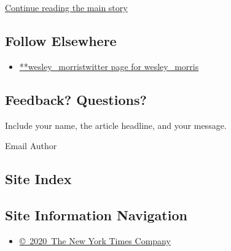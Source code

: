 \protect\hyperlink{after-mid2}{Continue reading the main story}

\hypertarget{follow-elsewhere}{%
\subsection{Follow Elsewhere}\label{follow-elsewhere}}

\begin{itemize}
\tightlist
\item
  \href{https://twitter.com/wesley_morris}{**wesley\_morristwitter page
  for wesley\_morris}
\end{itemize}

\hypertarget{feedback-questions}{%
\subsection{Feedback? Questions?}\label{feedback-questions}}

Include your name, the article headline, and your message.

Email Author

\hypertarget{site-index}{%
\subsection{Site Index}\label{site-index}}

\hypertarget{site-information-navigation}{%
\subsection{Site Information
Navigation}\label{site-information-navigation}}

\begin{itemize}
\tightlist
\item
  \href{https://help.nytimes3xbfgragh.onion/hc/en-us/articles/115014792127-Copyright-notice}{©~2020~The
  New York Times Company}
\end{itemize}

